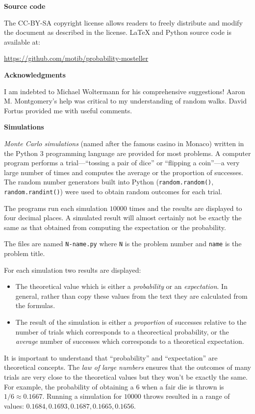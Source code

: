 \textbf{Source code}

The CC-BY-SA copyright license allows readers to freely distribute and modify the document as described in the license. \LaTeX{} and Python source code is available at:
\vspace*{-2ex}
\begin{center}
\url{https://github.com/motib/probability-mosteller}
\end{center}
\textbf{Acknowledgments}

I am indebted to Michael Woltermann for his comprehensive suggestions! Aaron M. Montgomery's help was critical to my understanding of random walks. David Fortus provided me with useful comments.

\newpage

\begin{center}
\textbf{\LARGE Simulations}
\end{center}


\bigskip

\emph{Monte Carlo simulations} (named after the famous casino in Monaco) written in the Python 3 programming language are provided for most problems. A computer program performs a trial---``tossing a pair of dice'' or ``flipping a coin''---a very large number of times and computes the average or the proportion of successes. The random number generators built into Python (\verb+random.random()+, \verb+random.randint()+) were used to obtain random outcomes for each trial.

The programs run each simulation $10000$ times and the results are displayed to four decimal places. A simulated result will almost certainly not be exactly the same as that obtained from computing the expectation or the probability.

The files are named \verb+N-name.py+ where \verb+N+ is the problem number and \verb+name+ is the problem title.

For each simulation two results are displayed: 
\begin{itemize}
\item The theoretical value which is either a \emph{probability} or an \emph{expectation}. In general, rather than copy these values from the text they are calculated from the formulas. 
\item The result of the simulation is either a \emph{proportion} of successes relative to the number of trials which corresponds to a theorectical probability, or the \emph{average} number of successes which corresponds to a theoretical expectation.
\end{itemize}
It is important to understand that ``probability'' and ``expectation'' are theoretical concepts. The \emph{law of large numbers} ensures that the outcomes of many trials are very close to the theoretical values but they won't be exactly the same. For example, the probability of obtaining a $6$ when a fair die is thrown is $1/6\approx 0.1667$. Running a simulation for $10000$ throws resulted in a range of values: $0.1684, 0.1693, 0.1687, 0.1665, 0.1656$.

